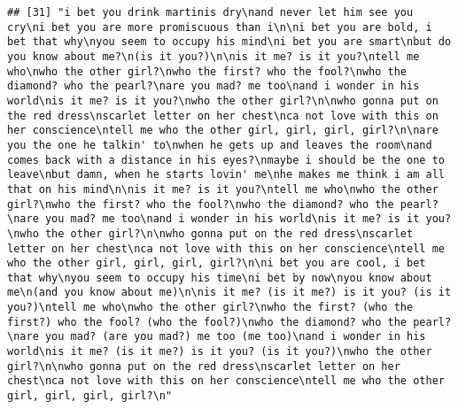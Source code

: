 \documentclass[]{article}
\begin{document}
\begin{verbatim}
## [31] "i bet you drink martinis dry\nand never let him see you cry\ni bet you are more promiscuous than i\n\ni bet you are bold, i bet that why\nyou seem to occupy his mind\ni bet you are smart\nbut do you know about me?\n(is it you?)\n\nis it me? is it you?\ntell me who\nwho the other girl?\nwho the first? who the fool?\nwho the diamond? who the pearl?\nare you mad? me too\nand i wonder in his world\nis it me? is it you?\nwho the other girl?\n\nwho gonna put on the red dress\nscarlet letter on her chest\nca not love with this on her conscience\ntell me who the other girl, girl, girl, girl?\n\nare you the one he talkin' to\nwhen he gets up and leaves the room\nand comes back with a distance in his eyes?\nmaybe i should be the one to leave\nbut damn, when he starts lovin' me\nhe makes me think i am all that on his mind\n\nis it me? is it you?\ntell me who\nwho the other girl?\nwho the first? who the fool?\nwho the diamond? who the pearl?\nare you mad? me too\nand i wonder in his world\nis it me? is it you?\nwho the other girl?\n\nwho gonna put on the red dress\nscarlet letter on her chest\nca not love with this on her conscience\ntell me who the other girl, girl, girl, girl?\n\ni bet you are cool, i bet that why\nyou seem to occupy his time\ni bet by now\nyou know about me\n(and you know about me)\n\nis it me? (is it me?) is it you? (is it you?)\ntell me who\nwho the other girl?\nwho the first? (who the first?) who the fool? (who the fool?)\nwho the diamond? who the pearl?\nare you mad? (are you mad?) me too (me too)\nand i wonder in his world\nis it me? (is it me?) is it you? (is it you?)\nwho the other girl?\n\nwho gonna put on the red dress\nscarlet letter on her chest\nca not love with this on her conscience\ntell me who the other girl, girl, girl, girl?\n"                                                                                                                                                                                                                                                                                                                                                                                                                                                                                                                                                                                                                                                                                                                                                                                                                                                                                                                                                                                                                                                                                                                           

\end{verbatim}
\end{document}
